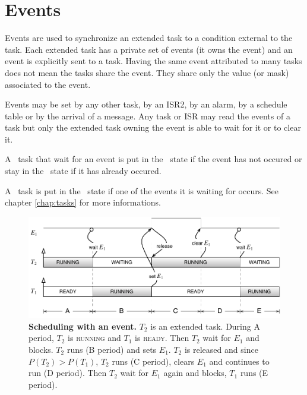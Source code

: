 
\chapter{Events}

\lettrine{E}vents are used to synchronize an extended task to a condition external to the task. Each extended task has a private set of events (it owns the event) and an event is explicitly sent to a task. Having the same event attributed to many tasks does not mean the tasks share the event. They share only the value (or mask) associated to the event.

Events may be set by any other task, by an ISR2, by an alarm, by a schedule table or by the arrival of a message. 
Any task or ISR may read the events of a task but only the extended task owning the event is able to wait for it or to clear it.


A \RUNNING\ task that wait for an event is put in the \WAITING\ state if the event has not occured or stay in the \RUNNING\ state if it has already occured. 

A \WAITING\ task is put in the \READY\ state if one of the events it is waiting for occurs. See chapter \ref{chap:tasks} for more informations.

\begin{figure}[htbp] %
   \centering
   \includegraphics[scale=.7]{pictures/schedulingEvent.pdf} 
   \caption{{\bfseries Scheduling with an event.}  $T_2$ is an extended task. During A period, $T_2$ is {\sffamily\scshape running} and $T_1$ is {\sffamily\scshape ready}. Then $T_2$ wait for $E_1$ and blocks. $T_2$ runs (B period) and sets $E_1$. $T_2$ is released and since $P(T_2)>P(T_1)$, $T_2$ runs (C period), clears $E_1$ and continues to run (D period). Then $T_2$ wait for $E_1$ again and blocks, $T_1$ runs (E period).}
   \label{fig:scheduleEvent}
\end{figure} 


